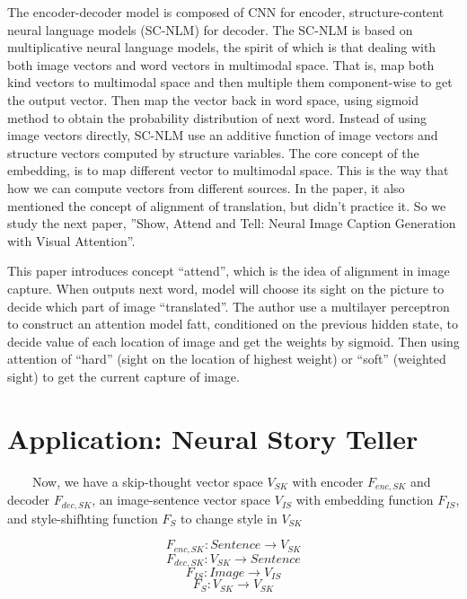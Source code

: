 \documentclass{article}
\begin{document}
	The encoder-decoder model is composed of CNN for encoder, structure-content neural language models (SC-NLM) for decoder. The SC-NLM is based on multiplicative neural language models, the spirit of which is that dealing with both image vectors and word vectors in multimodal space. That is, map both kind vectors to multimodal space and then multiple them component-wise to get the output vector. Then map the vector back in word space, using sigmoid method to obtain the probability distribution of next word. Instead of using image vectors directly, SC-NLM use an additive function of image vectors and structure vectors computed by structure variables.
	The core concept of the embedding, is to map different vector to multimodal space. This is the way that how we can compute vectors from different sources. In the paper, it also mentioned the concept of alignment of translation, but didn’t practice it. So we study the next paper, ”Show, Attend and Tell: Neural Image Caption Generation with Visual Attention”.
	
	This paper introduces concept “attend”, which is the idea of alignment in image capture. When outputs next word, model will choose its sight on the picture to decide which part of image “translated”. The author use a multilayer perceptron to construct an attention model fatt, conditioned on the previous hidden state, to decide value of each location of image and get the weights by sigmoid. Then using attention of “hard” (sight on the location of highest weight) or “soft” (weighted sight) to get the current capture of image.
 	
\section{Application: Neural Story Teller}
	\par ~~~~Now, we have a skip-thought vector space $V_{SK}$ with encoder $F_{enc,SK}$ and decoder $F_{dec,SK}$, an image-sentence vector space $V_{IS}$ with embedding function $F_{IS}$, and style-shifhting function $F_S$ to change style in $V_{SK}$

	\[ F_{enc,SK} : \textit{Sentence} \to V_{SK}\]
	\[ F_{dec,SK} : V_{SK} \to \textit{Sentence}\]
	\[ F_{IS} : \textit{Image} \to V_{IS}\]
	\[ F_S : V_{SK} \to V_{SK}\]
	\newline
\end{document}
